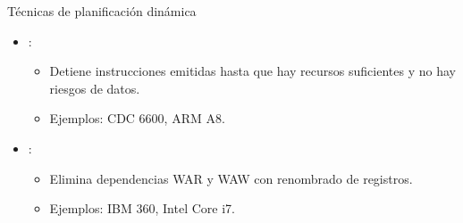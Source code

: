 \begin{frame}[t]{Técnicas de planificación dinámica}
\begin{itemize}
  \item {}:
    \begin{itemize}
      \item Detiene instrucciones emitidas hasta que hay recursos suficientes y no hay riesgos de datos.
      \item Ejemplos: CDC 6600, ARM A8.
    \end{itemize}

  \item {}:
    \begin{itemize}
      \item Elimina dependencias WAR y WAW con renombrado de registros.
      \item Ejemplos: IBM 360, Intel Core i7.
    \end{itemize}
\end{itemize}
\end{frame}

